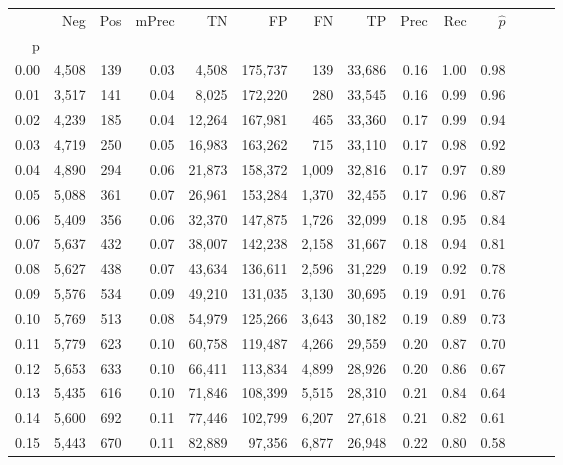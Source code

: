 \begin{tabular}{rrrrrrrrrrrrrr}
\toprule
{} &    Neg &  Pos & mPrec &       TN &       FP &      FN &      TP &  Prec &   Rec & $\hat{p}$ \\
p    &        &      &       &          &          &         &         &       &       &           \\
\midrule
0.00 &  4,508 &  139 &  0.03 &    4,508 &  175,737 &     139 &  33,686 &  0.16 &  1.00 &      0.98 \\
0.01 &  3,517 &  141 &  0.04 &    8,025 &  172,220 &     280 &  33,545 &  0.16 &  0.99 &      0.96 \\
0.02 &  4,239 &  185 &  0.04 &   12,264 &  167,981 &     465 &  33,360 &  0.17 &  0.99 &      0.94 \\
0.03 &  4,719 &  250 &  0.05 &   16,983 &  163,262 &     715 &  33,110 &  0.17 &  0.98 &      0.92 \\
0.04 &  4,890 &  294 &  0.06 &   21,873 &  158,372 &   1,009 &  32,816 &  0.17 &  0.97 &      0.89 \\
0.05 &  5,088 &  361 &  0.07 &   26,961 &  153,284 &   1,370 &  32,455 &  0.17 &  0.96 &      0.87 \\
0.06 &  5,409 &  356 &  0.06 &   32,370 &  147,875 &   1,726 &  32,099 &  0.18 &  0.95 &      0.84 \\
0.07 &  5,637 &  432 &  0.07 &   38,007 &  142,238 &   2,158 &  31,667 &  0.18 &  0.94 &      0.81 \\
0.08 &  5,627 &  438 &  0.07 &   43,634 &  136,611 &   2,596 &  31,229 &  0.19 &  0.92 &      0.78 \\
0.09 &  5,576 &  534 &  0.09 &   49,210 &  131,035 &   3,130 &  30,695 &  0.19 &  0.91 &      0.76 \\
0.10 &  5,769 &  513 &  0.08 &   54,979 &  125,266 &   3,643 &  30,182 &  0.19 &  0.89 &      0.73 \\
0.11 &  5,779 &  623 &  0.10 &   60,758 &  119,487 &   4,266 &  29,559 &  0.20 &  0.87 &      0.70 \\
0.12 &  5,653 &  633 &  0.10 &   66,411 &  113,834 &   4,899 &  28,926 &  0.20 &  0.86 &      0.67 \\
0.13 &  5,435 &  616 &  0.10 &   71,846 &  108,399 &   5,515 &  28,310 &  0.21 &  0.84 &      0.64 \\
0.14 &  5,600 &  692 &  0.11 &   77,446 &  102,799 &   6,207 &  27,618 &  0.21 &  0.82 &      0.61 \\
0.15 &  5,443 &  670 &  0.11 &   82,889 &   97,356 &   6,877 &  26,948 &  0.22 &  0.80 &      0.58 \\

\end{tabular}
